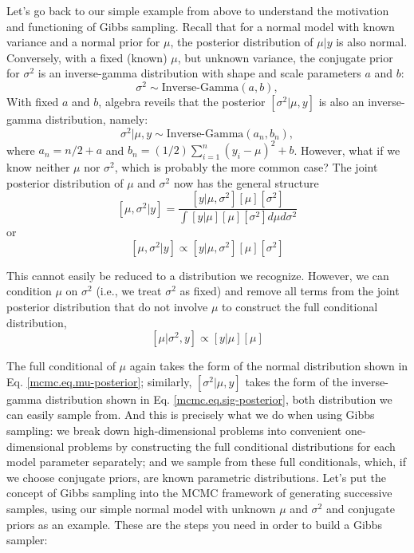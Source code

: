 Let's go back to our simple example from above to understand the
motivation and functioning of Gibbs sampling. Recall that for a normal
model with known variance and a normal prior for $\mu$, the posterior
distribution of $\mu|y$ is also normal. Conversely, with a fixed
(known) $\mu$, but unknown variance, the conjugate prior for
$\sigma^2$ is an inverse-gamma distribution with shape and scale
parameters $a$ and $b$:
\[
\sigma^2 \sim \mbox{Inverse-Gamma}(a,b),
\]
With fixed $a$ and $b$, algebra reveils that the posterior $[\sigma^2|\mu,y]$ is also an inverse-gamma distribution, namely:
\begin{equation}
\sigma^2|\mu,y \sim \mbox{Inverse-Gamma} (a_n, b_n),
\label{mcmc.eq.sig-posterior}
\end{equation}
 where  $a_n = n/2   + a$ and $b_n = (1/2) \displaystyle\sum\limits_{i=1}^{n} (y_i-\mu)^2 + b$.
However, what if we know neither $\mu$ nor $\sigma^2$, which is probably the
more common case? The joint posterior distribution of $\mu$ and $\sigma^2$
now has the general structure
\[
[\mu, \sigma^2|y] = \frac{[y|\mu,\sigma^2] [\mu] [\sigma^2]}{ \int [y|\mu] [\mu] [\sigma^2] d\mu d\sigma^2 }
\]
or
\[
[\mu, \sigma^2|y] \propto [y|\mu, \sigma^2] [\mu] [\sigma^2]
\]

This cannot easily be reduced to a distribution we recognize. However,
we can condition $\mu$ on $\sigma^2$ (i.e., we treat $\sigma^2$ as fixed) and remove
all terms from the joint posterior distribution that do not involve $\mu$
to construct the full conditional distribution,
\[
[\mu|\sigma^2,y]  \propto [y|\mu] [\mu]
\]

The full conditional of $\mu$ again takes the form of the normal
distribution shown in Eq. \ref{mcmc.eq.mu-posterior}; similarly, $[\sigma^2|\mu,y]$ takes
the form of the inverse-gamma distribution shown in
Eq. \ref{mcmc.eq.sig-posterior}, both distribution we can easily sample
from. And this is precisely what we do when using Gibbs sampling: we
break down high-dimensional problems into convenient one-dimensional
problems by constructing the full conditional distributions for each
model parameter separately; and we sample from these full
conditionals, which, if we choose conjugate priors, are known
parametric distributions.
Let's put the concept of Gibbs sampling into the MCMC framework of
generating successive samples, using our simple normal model with
unknown $\mu$ and $\sigma^2$ and conjugate priors as an example. These are the
steps you need in order to build a Gibbs sampler:

